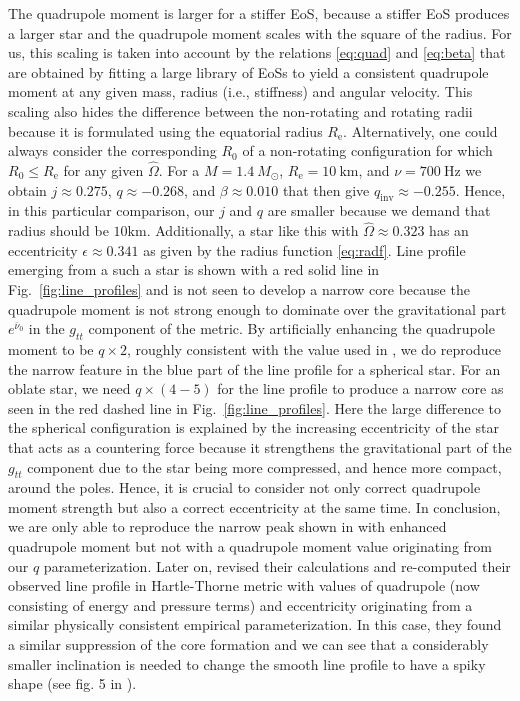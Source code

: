 \documentclass{aa}
\newcommand{\Ob}{\ensuremath{\hat{\Omega}}}
\newcommand{\nub}{\ensuremath{\bar{\nu}}}
\newcommand{\Msun}{\ensuremath{M_{\odot}}}
\newcommand{\qinv}{\ensuremath{q_{\mathrm{inv}}}}
\begin{document}
The quadrupole moment is larger for a stiffer EoS, because a stiffer EoS produces a larger star and the quadrupole moment scales with the square of the radius.
For us, this scaling is taken into account by the relations \eqref{eq:quad} and \eqref{eq:beta} that are obtained by fitting a large library of EoSs \citep[see][]{BBP13, aGM14} to yield a consistent quadrupole moment at any given mass, radius (i.e., stiffness) and angular velocity.
This scaling also hides the difference between the non-rotating and rotating radii because it is formulated using the equatorial radius $R_{\mathrm{e}}$.
Alternatively, one could always consider the corresponding $R_0$ of a non-rotating configuration for which $R_0 \le R_{\mathrm{e}}$ for any given $\Ob$.
For a $M=1.4~\Msun$, $R_{\mathrm{e}}=10~\mathrm{km}$, and $\nu = 700~\mathrm{Hz}$ we obtain $j \approx 0.275$, $q \approx -0.268$, and $\beta \approx 0.010$ that then give $\qinv \approx -0.255$.
Hence, in this particular comparison, our $j$ and $q$ are smaller because we demand that radius should be $10\mathrm{km}$.
Additionally, a star like this with $\Ob \approx 0.323$ has an eccentricity $\epsilon \approx 0.341$ as given by the radius function \eqref{eq:radf}.
Line profile emerging from a such a star is shown with a red solid line in Fig.~\ref{fig:line_profiles} and is not seen to develop a narrow core because the quadrupole moment is not strong enough to dominate over the gravitational part $e^{\nub_0}$ in the $g_{tt}$ component of the metric.
By artificially enhancing the quadrupole moment to be $q \times 2$, roughly consistent with the value used in \citet{BPO13}, we do reproduce the narrow feature in the blue part of the line profile for a spherical star.
For an oblate star, we need $q \times (4-5)$ for the line profile to produce a narrow core as seen in the red dashed line in Fig.~\ref{fig:line_profiles}.
Here the large difference to the spherical configuration is explained by the increasing eccentricity of the star that acts as a countering force because it strengthens the gravitational part of the $g_{tt}$ component due to the star being more compressed, and hence more compact, around the poles.
Hence, it is crucial to consider not only correct quadrupole moment strength but also a correct eccentricity at the same time.
In conclusion, we are only able to reproduce the narrow peak shown in \citet{BPO13} with enhanced quadrupole moment but not with a quadrupole moment value originating from our $q$ parameterization.
Later on, \citet{BBP13} revised their calculations and re-computed their observed line profile in Hartle-Thorne metric with values of quadrupole (now consisting of energy and pressure terms) and eccentricity originating from a similar physically consistent empirical parameterization.
In this case, they found a similar suppression of the core formation and we can see that a considerably smaller inclination is needed to change the smooth line profile to have a spiky shape (see fig. 5 in \citealt{BBP13}).
\end{document}
